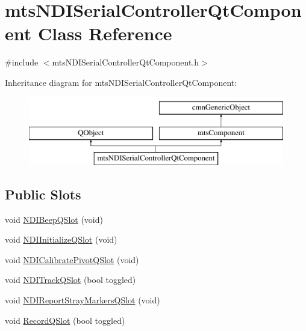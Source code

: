 \hypertarget{classmts_n_d_i_serial_controller_qt_component}{}\section{mts\+N\+D\+I\+Serial\+Controller\+Qt\+Component Class Reference}
\label{classmts_n_d_i_serial_controller_qt_component}


{\ttfamily \#include $<$mts\+N\+D\+I\+Serial\+Controller\+Qt\+Component.\+h$>$}

Inheritance diagram for mts\+N\+D\+I\+Serial\+Controller\+Qt\+Component\+:\begin{figure}[H]
\begin{center}
\leavevmode
\includegraphics[height=3.000000cm]{db/d54/classmts_n_d_i_serial_controller_qt_component}
\end{center}
\end{figure}
\subsection*{Public Slots}
\begin{DoxyCompactItemize}
\item 
void \hyperlink{classmts_n_d_i_serial_controller_qt_component_a6ee96152ae23b8560a571372ed11812b}{N\+D\+I\+Beep\+Q\+Slot} (void)
\item 
void \hyperlink{classmts_n_d_i_serial_controller_qt_component_a3e6933e09cde1eae1bdc565e6f0b4739}{N\+D\+I\+Initialize\+Q\+Slot} (void)
\item 
void \hyperlink{classmts_n_d_i_serial_controller_qt_component_adb8f93a1da10a9ba7bba00448d1691e6}{N\+D\+I\+Calibrate\+Pivot\+Q\+Slot} (void)
\item 
void \hyperlink{classmts_n_d_i_serial_controller_qt_component_a9d5912bdd1098c27ff09254541e58de2}{N\+D\+I\+Track\+Q\+Slot} (bool toggled)
\item 
void \hyperlink{classmts_n_d_i_serial_controller_qt_component_a0debe2072c83040238578397eed8793e}{N\+D\+I\+Report\+Stray\+Markers\+Q\+Slot} (void)
\item 
void \hyperlink{classmts_n_d_i_serial_controller_qt_component_acf2db3da376b6583e05d92347e16cc40}{Record\+Q\+Slot} (bool toggled)
\end{DoxyCompactItemize}
